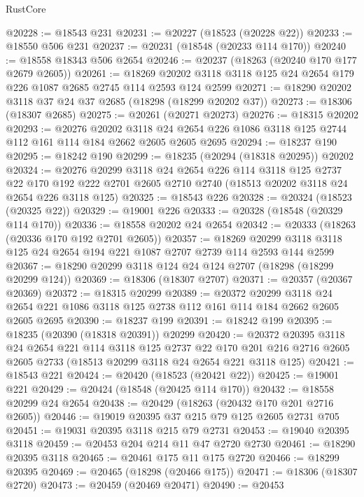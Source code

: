 \begin{lexlean}{RustCore}
\begin{coremodule}
@20228 := @18543 @231
@20231 := @20227 (@18523 (@20228 @22))
@20233 := @18550 @506 @231
@20237 := @20231 (@18548 (@20233 @114 @170))
@20240 := @18558 @18343 @506 @2654
@20246 := @20237 (@18263 (@20240 @170 @177 @2679 @2605))
@20261 := @18269 @20202 @3118 @3118 @125 @24 @2654 @179 @226 @1087 @2685 @2745 @114 @2593 @124 @2599
@20271 := @18290 @20202 @3118 @37 @24 @37 @2685 (@18298 (@18299 @20202 @37))
@20273 := @18306 (@18307 @2685)
@20275 := @20261 (@20271 @20273)
@20276 := @18315 @20202
@20293 := @20276
    @20202
    @3118
    @24
    @2654
    @226
    @1086
    @3118
    @125
    @2744
    @112
    @161
    @114
    @184
    @2662
    @2605
    @2605
    @2695
@20294 := @18237 @190
@20295 := @18242 @190
@20299 := @18235 (@20294 (@18318 @20295)) @20202
@20324 := @20276
    @20299
    @3118
    @24
    @2654
    @226
    @114
    @3118
    @125
    @2737
    @22
    @170
    @192
    @222
    @2701
    @2605
    @2710
    @2740
    (@18513 @20202 @3118 @24 @2654 @226 @3118 @125)
@20325 := @18543 @226
@20328 := @20324 (@18523 (@20325 @22))
@20329 := @19001 @226
@20333 := @20328 (@18548 (@20329 @114 @170))
@20336 := @18558 @20202 @24 @2654
@20342 := @20333 (@18263 (@20336 @170 @192 @2701 @2605))
@20357 := @18269 @20299 @3118 @3118 @125 @24 @2654 @194 @221 @1087 @2707 @2739 @114 @2593 @144 @2599
@20367 := @18290 @20299 @3118 @124 @24 @124 @2707 (@18298 (@18299 @20299 @124))
@20369 := @18306 (@18307 @2707)
@20371 := @20357 (@20367 @20369)
@20372 := @18315 @20299
@20389 := @20372
    @20299
    @3118
    @24
    @2654
    @221
    @1086
    @3118
    @125
    @2738
    @112
    @161
    @114
    @184
    @2662
    @2605
    @2605
    @2695
@20390 := @18237 @199
@20391 := @18242 @199
@20395 := @18235 (@20390 (@18318 @20391)) @20299
@20420 := @20372
    @20395
    @3118
    @24
    @2654
    @221
    @114
    @3118
    @125
    @2737
    @22
    @170
    @201
    @216
    @2716
    @2605
    @2605
    @2733
    (@18513 @20299 @3118 @24 @2654 @221 @3118 @125)
@20421 := @18543 @221
@20424 := @20420 (@18523 (@20421 @22))
@20425 := @19001 @221
@20429 := @20424 (@18548 (@20425 @114 @170))
@20432 := @18558 @20299 @24 @2654
@20438 := @20429 (@18263 (@20432 @170 @201 @2716 @2605))
@20446 := @19019 @20395 @37 @215 @79 @125 @2605 @2731 @705
@20451 := @19031 @20395 @3118 @215 @79 @2731
@20453 := @19040 @20395 @3118
@20459 := @20453 @204 @214 @11 @47 @2720 @2730
@20461 := @18290 @20395 @3118
@20465 := @20461 @175 @11 @175 @2720
@20466 := @18299 @20395
@20469 := @20465 (@18298 (@20466 @175))
@20471 := @18306 (@18307 @2720)
@20473 := @20459 (@20469 @20471)
@20490 := @20453

\end{coremodule}
\end{lexlean}
